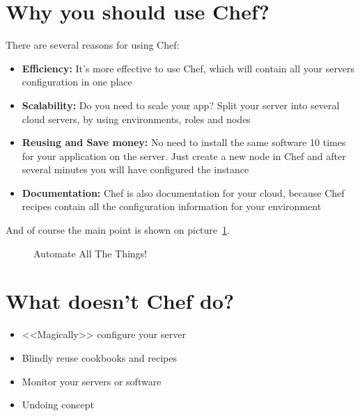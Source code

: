 \section{Why you should use Chef?}
\label{sec:what-benefits}

There are several reasons for using Chef:

\begin{itemize}
  \item \textbf{Efficiency:} It's more effective to use Chef, which will contain all your servers configuration in one place
  \item \textbf{Scalability:} Do you need to scale your app? Split your server into several cloud servers, by using environments, roles and nodes
  \item \textbf{Reusing and Save money:} No need to install the same software 10 times for your application on the server. Just create a new node in Chef and after several minutes you will have configured the instance
  \item \textbf{Documentation:} Chef is also documentation for your cloud, because Chef recipes contain all the configuration information for your environment
\end{itemize}

And of course the main point is shown on picture~\ref{fig:automate-all-the-things}.

\begin{figure}[ht!]
  \caption{Automate All The Things!}
  \label{fig:automate-all-the-things}
\end{figure}


\section{What doesn't Chef do?}

\begin{itemize}
  \item <<Magically>> configure your server
  \item Blindly reuse cookbooks and recipes
  \item Monitor your servers or software
  \item Undoing concept
\end{itemize}
